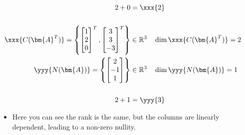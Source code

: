 \begin{itemize}
\begin{itemize}
\begin{align*}
      \\
      \hspace{83pt} 2 + 0 &= \xxx{2} \\
      \\
      \xxx{C(\bm{A}^T)} = \left\{ 
        \begin{bmatrix} 1 \\ 2 \\ 0 \end{bmatrix}^T,
        \begin{bmatrix} 3 \\ 3 \\ -3 \end{bmatrix}^T
      \right\}
      &\in \mathbb{R}^3 \quad \dim{\xxx{C(\bm{A}^T)}} = 2 \\
      \yyy{N(\bm{A})} = \left\{\begin{bmatrix} 2 \\ -1 \\ 1 \end{bmatrix}\right\} 
      &\in \mathbb{R}^3 \quad \dim{\yyy{N(\bm{A})}} = 1 \\
      \\
      2 + 1 &= \yyy{3}
    \end{align*}
    \begin{itemize}
      \item Here you can see the rank is the same, but the columns are linearly dependent, leading to a non-zero nullity. 
    \end{itemize}
  \end{itemize}
\end{itemize}
